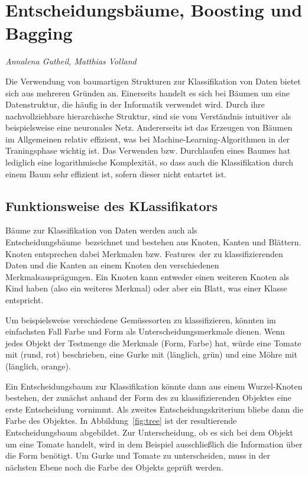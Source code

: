 \section{Entscheidungsbäume, Boosting und Bagging}
\label{mainsec:trees}
\textit{Annalena Gutheil, Matthias Volland}

Die Verwendung von baumartigen Strukturen zur Klassifikation von Daten bietet sich aus mehreren Gründen an. 
Einerseits handelt es sich bei Bäumen um eine Datenstruktur, die häufig in der Informatik verwendet wird. Durch ihre nachvollziehbare hierarchische Struktur, sind sie vom Verständnis intuitiver als beispielsweise eine neuronales Netz.
Andererseits ist das Erzeugen von Bäumen im Allgemeinen relativ effizient, was bei Machine-Learning-Algorithmen 
in der Traningsphase wichtig ist. Das Verwenden bzw. Durchlaufen eines Baumes hat lediglich eine logarithmische Komplexität, 
so dass auch die Klassifikation durch einem Baum sehr effizient ist, sofern dieser nicht entartet ist. 

\subsection{Funktionsweise des KLassifikators}

Bäume zur Klassifikation von Daten werden auch als \glqq Entscheidungsbäume\grqq\ bezeichnet und bestehen aus Knoten, Kanten und Blättern. Knoten entsprechen dabei Merkmalen bzw. \glqq Features\grqq\ der zu klassifizierenden Daten und die Kanten an einem Knoten den verschiedenen Merkmalsausprägungen. 
Ein Knoten kann entweder einen weiteren Knoten als Kind haben (also ein weiteres Merkmal) oder aber ein Blatt, was einer Klasse entspricht.

Um beispielsweise verschiedene Gemüsesorten zu klassifizieren, könnten im einfachsten Fall Farbe und Form als Unterscheidungsmerkmale dienen. Wenn jedes Objekt der Testmenge die Merkmale (Form, Farbe) hat, würde eine Tomate mit (rund, rot) beschrieben, eine Gurke mit (länglich, grün) und eine Möhre mit (länglich, orange).

Ein Entscheidungsbaum zur Klassifikation könnte dann aus einem Wurzel-Knoten bestehen, der zunächst anhand der Form 
des zu klassifizierenden Objektes eine erste Entscheidung vornimmt. Als zweites Entscheidungskriterium bliebe dann die Farbe des Objektes. In Abbildung~\ref{fig:tree} ist der resultierende Entscheidungsbaum abgebildet. Zur Unterscheidung, ob es sich bei dem Objekt um eine Tomate handelt, wird in dem Beispiel ausschließlich die Information über die Form benötigt. Um Gurke und Tomate zu unterscheiden, muss in der nächsten Ebene noch die Farbe des Objekts geprüft werden.

